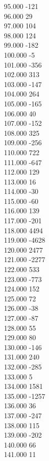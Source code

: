 { 95.000	-121 \\
 96.000	29 \\
 97.000	104 \\
 98.000	124 \\
 99.000	-182 \\
 100.000	-5 \\
 101.000	-356 \\
 102.000	313 \\
 103.000	-147 \\
 104.000	264 \\
 105.000	-165 \\
 106.000	40 \\
 107.000	-152 \\
 108.000	325 \\
 109.000	-256 \\
 110.000	722 \\
 111.000	-647 \\
 112.000	129 \\
 113.000	16 \\
 114.000	-30 \\
 115.000	-60 \\
 116.000	139 \\
 117.000	-201 \\
 118.000	4494 \\
 119.000	-4628 \\
 120.000	2477 \\
 121.000	-2277 \\
 122.000	533 \\
 123.000	-773 \\
 124.000	152 \\
 125.000	72 \\
 126.000	-38 \\
 127.000	-87 \\
 128.000	55 \\
 129.000	80 \\
 130.000	-146 \\
 131.000	240 \\
 132.000	-285 \\
 133.000	5 \\
 134.000	1581 \\
 135.000	-1257 \\
 136.000	36 \\
 137.000	-247 \\
 138.000	115 \\
 139.000	-202 \\
 140.000	66 \\
 141.000	11 \\
}
